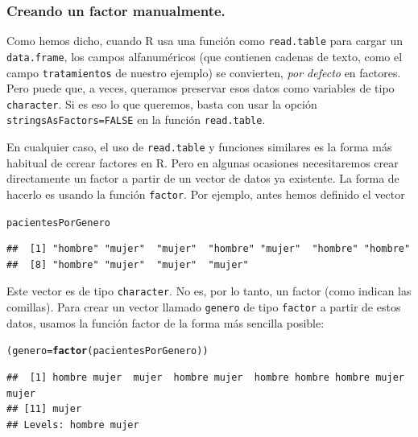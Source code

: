 \documentclass[10pt,a4paper]{article}\usepackage[]{graphicx}\usepackage[]{color}
\makeatletter
\newcommand{\hlstd}[1]{\textcolor[rgb]{0.345,0.345,0.345}{#1}}%
\newcommand{\hlkwb}[1]{\textcolor[rgb]{0.69,0.353,0.396}{#1}}%
\newcommand{\hlkwd}[1]{\textcolor[rgb]{0.737,0.353,0.396}{\textbf{#1}}}%
\newenvironment{kframe}{%
 \def\at@end@of@kframe{}%
 \ifinner\ifhmode%
  \def\at@end@of@kframe{\end{minipage}}%
  \begin{minipage}{\columnwidth}%
 \fi\fi%
 \def\FrameCommand##1{\hskip\@totalleftmargin \hskip-\fboxsep
 \colorbox{shadecolor}{##1}\hskip-\fboxsep
     \hskip-\linewidth \hskip-\@totalleftmargin \hskip\columnwidth}%
 \MakeFramed {\advance\hsize-\width
   \@totalleftmargin\z@ \linewidth\hsize
   \@setminipage}}%
 {\par\unskip\endMakeFramed%
 \at@end@of@kframe}
\newenvironment{knitrout}{}{} %
\newcounter {cont01}
\makeatother
\begin{document}
\subsubsection{Creando un factor manualmente.}

Como hemos dicho, cuando R usa una función como {\tt read.table} para cargar un {\tt data.frame}, los campos alfanuméricos (que contienen cadenas de texto, como el campo {\tt tratamientos} de nuestro ejemplo) se convierten, {\em por defecto} en factores. Pero puede que, a veces, queramos preservar esos datos como variables de tipo {\tt character}. Si es eso lo que queremos, basta con usar la opción {\tt stringsAsFactors=FALSE} en la función {\tt read.table}.

En cualquier caso, el uso de {\tt read.table} y funciones similares es la forma más habitual de ccrear factores en R. Pero en algunas ocasiones necesitaremos crear directamente un factor a partir de un vector de datos ya existente. La forma de hacerlo es usando la función {\tt factor}. Por ejemplo, antes hemos definido el vector

\begin{knitrout}
\color{fgcolor}\begin{kframe}
\begin{alltt}
\hlstd{pacientesPorGenero}
\end{alltt}
\begin{verbatim}
##  [1] "hombre" "mujer"  "mujer"  "hombre" "mujer"  "hombre" "hombre"
##  [8] "hombre" "mujer"  "mujer"  "mujer"
\end{verbatim}
\end{kframe}
\end{knitrout}

Este vector es de tipo {\tt character}. No es, por lo tanto, un factor (como indican las comillas).
Para crear un vector llamado {\tt genero}  de tipo {\tt factor} a partir de estos datos, usamos la función factor de la forma más  sencilla posible:

\begin{knitrout}
\color{fgcolor}\begin{kframe}
\begin{alltt}
\hlstd{(genero} \hlkwb{=} \hlkwd{factor}\hlstd{(pacientesPorGenero))}
\end{alltt}
\begin{verbatim}
##  [1] hombre mujer  mujer  hombre mujer  hombre hombre hombre mujer  mujer 
## [11] mujer 
## Levels: hombre mujer
\end{verbatim}
\end{kframe}
\end{knitrout}
\end{document}
